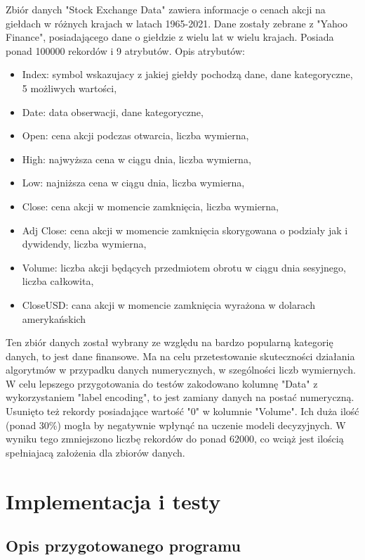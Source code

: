 \documentclass[12pt,twoside]{article}
\begin{document}
Zbiór danych "Stock Exchange Data" zawiera informacje o cenach akcji na giełdach w różnych krajach w latach 1965-2021.
Dane zostały zebrane z "Yahoo Finance", posiadającego dane o giełdzie z wielu lat w wielu krajach.
Posiada ponad 100000 rekordów i 9 atrybutów. \cite{stock} Opis atrybutów:
\begin{itemize}[label=-,labelsep=0.4cm, leftmargin=1.25cm]
    \item Index: symbol wskazujacy z jakiej giełdy pochodzą dane, dane kategoryczne, 5 możliwych wartości,
    \item Date: data obserwacji, dane kategoryczne,
    \item Open: cena akcji podczas otwarcia, liczba wymierna,
    \item High: najwyższa cena w ciągu dnia, liczba wymierna,
    \item Low: najniższa cena w ciągu dnia, liczba wymierna,
    \item Close: cena akcji w momencie zamknięcia, liczba wymierna,
    \item Adj Close: cena akcji w momencie zamknięcia skorygowana o podziały jak i dywidendy, liczba wymierna,
    \item Volume: liczba akcji będących przedmiotem obrotu w ciągu dnia sesyjnego, liczba całkowita,
    \item CloseUSD: cana akcji w momencie zamknięcia wyrażona w dolarach amerykańskich
\end{itemize}
Ten zbiór danych został wybrany ze względu na bardzo popularną kategorię danych, to jest dane finansowe.
Ma na celu przetestowanie skuteczności działania algorytmów w przypadku danych numerycznych,
w szególności liczb wymiernych.
W celu lepszego przygotowania do testów zakodowano kolumnę "Data" z wykorzystaniem "label encoding",
to jest zamiany danych na postać numeryczną.
Usunięto też rekordy posiadające wartość "0" w kolumnie "Volume".
Ich duża ilość (ponad 30\%) mogła by negatywnie wpłynąć na uczenie modeli decyzyjnych.
W wyniku tego zmniejszono liczbę rekordów do ponad 62000,
co wciąż jest ilością spełniajacą założenia dla zbiorów danych.


\clearpage
\section{Implementacja i testy}
\subsection{Opis przygotowanego programu}
\end{document}
